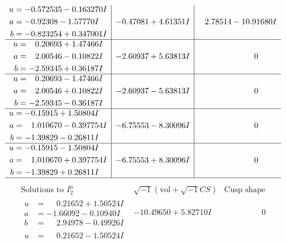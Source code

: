 \documentclass[1p]{elsarticle_modified}
\theoremstyle{definition}
\newcommand{\I}{\sqrt{-1}}
\begin{document}
$$\begin{array}{c|c|c}
\begin{aligned}
u &= -0.572535 - 0.163270 I \\
a &= -0.92308 - 1.57770 I \\
b &= -0.823254 + 0.347001 I\end{aligned}
 & -0.47081 + 4.61351 I & \phantom{-}2.78514 - 10.91680 I \\ \hline\begin{aligned}
u &= \phantom{-}0.20693 + 1.47466 I \\
a &= \phantom{-}2.00546 - 0.10822 I \\
b &= -2.59345 + 0.36187 I\end{aligned}
 & -2.60937 + 5.63813 I & \phantom{-0.000000 } 0 \\ \hline\begin{aligned}
u &= \phantom{-}0.20693 - 1.47466 I \\
a &= \phantom{-}2.00546 + 0.10822 I \\
b &= -2.59345 - 0.36187 I\end{aligned}
 & -2.60937 - 5.63813 I & \phantom{-0.000000 } 0 \\ \hline\begin{aligned}
u &= -0.15915 + 1.50804 I \\
a &= \phantom{-}1.010670 - 0.397754 I \\
b &= -1.39829 - 0.26811 I\end{aligned}
 & -6.75553 - 8.30096 I & \phantom{-0.000000 } 0 \\ \hline\begin{aligned}
u &= -0.15915 - 1.50804 I \\
a &= \phantom{-}1.010670 + 0.397754 I \\
b &= -1.39829 + 0.26811 I\end{aligned}
 & -6.75553 + 8.30096 I & \phantom{-0.000000 } 0\\
 \hline 
 \end{array}$$\newpage$$\begin{array}{c|c|c}  
\text{Solutions to }I^u_{2}& \I (\text{vol} + \sqrt{-1}CS) & \text{Cusp shape}\\
 \hline 
\begin{aligned}
u &= \phantom{-}0.21652 + 1.50524 I \\
a &= -1.66092 - 0.10940 I \\
b &= \phantom{-}2.94978 - 0.49926 I\end{aligned}
 & -10.49650 + 5.82710 I & \phantom{-0.000000 } 0 \\ \hline\begin{aligned}
u &= \phantom{-}0.21652 - 1.50524 I \\

\end{aligned}
\end{array}$$
\end{document}
